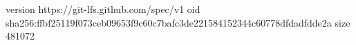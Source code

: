 version https://git-lfs.github.com/spec/v1
oid sha256:ffbf25119f073ceb09653f9c60c7bafc3de221584152344c60778dfdadfdde2a
size 481072
